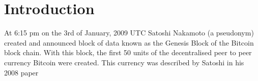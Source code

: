 \section{Introduction}
%
%



% 
% 
% 
% 

At 6:15 pm on the 3rd of January, 2009 UTC Satoshi Nakamoto (a pseudonym)
created and announced block of data known as the Genesis Block of the Bitcoin
block chain\cite{satoshi}. With this block, the first 50 units of the
decentralised peer to peer currency Bitcoin were created.  This currency was
described by Satoshi in his 2008 paper

